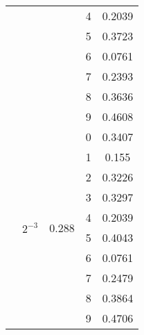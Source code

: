 \documentclass[a4paper,12pt]{article}
\begin{document}
\begin{table}[h]
\begin{tabular}{ |c|c|c|c|c| }
                      &                                         &                         & 4 & 0.2039 \\ \cline{4-5} 
                      &                                         &                         & 5 & 0.3723 \\ \cline{4-5} 
                      &                                         &                         & 6 & 0.0761 \\ \cline{4-5} 
                      &                                         &                         & 7 & 0.2393 \\ \cline{4-5} 
                      &                                         &                         & 8 & 0.3636 \\ \cline{4-5} 
                      &                                         &                         & 9 & 0.4608 \\ \cline{2-5} 
					  &              \multirow{10}{*}{$2^{-3}$} & \multirow{10}{*}{0.288} & 0 & 0.3407 \\ \cline{4-5} 
                      &                                         &                         & 1 & 0.155  \\ \cline{4-5} 
                      &                                         &                         & 2 & 0.3226 \\ \cline{4-5} 
                      &                                         &                         & 3 & 0.3297 \\ \cline{4-5} 
                      &                                         &                         & 4 & 0.2039 \\ \cline{4-5} 
                      &                                         &                         & 5 & 0.4043 \\ \cline{4-5} 
                      &                                         &                         & 6 & 0.0761 \\ \cline{4-5} 
                      &                                         &                         & 7 & 0.2479 \\ \cline{4-5} 
                      &                                         &                         & 8 & 0.3864 \\ \cline{4-5} 
                      &                                         &                         & 9 & 0.4706 \\ \hline
\end{tabular}
\end{table}
\end{document}
